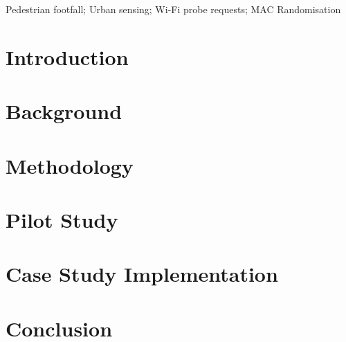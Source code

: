 \documentclass[]{interact}
\theoremstyle{plain}
\theoremstyle{definition}
\theoremstyle{remark}
\begin{document}
	\begin{abstract}
		 \end{abstract}
	\begin{keywords}
		Pedestrian footfall; Urban sensing; Wi-Fi probe requests; MAC Randomisation \end{keywords}
	\section{Introduction}\label{introduction}
		
	\section{Background}\label{previous_work}
		
	\section{Methodology}\label{methodology}
		
	\section{Pilot Study}\label{pilot_study}
		
	\section{Case Study Implementation}\label{main_study}
		
	\section{Conclusion}\label{conclusion}
		
	 
\end{document}
